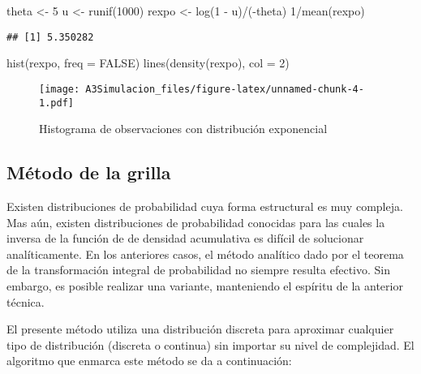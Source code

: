 \documentclass[
  spanish,
]{book}
\newenvironment{Shaded}{\begin{snugshade}}{\end{snugshade}}
\newcommand{\AttributeTok}[1]{\textcolor[rgb]{0.77,0.63,0.00}{#1}}
\newcommand{\ConstantTok}[1]{\textcolor[rgb]{0.00,0.00,0.00}{#1}}
\newcommand{\DecValTok}[1]{\textcolor[rgb]{0.00,0.00,0.81}{#1}}
\newcommand{\FunctionTok}[1]{\textcolor[rgb]{0.00,0.00,0.00}{#1}}
\newcommand{\NormalTok}[1]{#1}
\newcommand{\OtherTok}[1]{\textcolor[rgb]{0.56,0.35,0.01}{#1}}
\newcommand{\SpecialCharTok}[1]{\textcolor[rgb]{0.00,0.00,0.00}{#1}}
\theoremstyle{definition}
\theoremstyle{definition}
\theoremstyle{definition}
\theoremstyle{definition}
\theoremstyle{remark}
\begin{document}
\begin{Shaded}
\begin{Highlighting}[]
\NormalTok{theta }\OtherTok{\textless{}{-}} \DecValTok{5}
\NormalTok{u }\OtherTok{\textless{}{-}} \FunctionTok{runif}\NormalTok{(}\DecValTok{1000}\NormalTok{)}
\NormalTok{rexpo }\OtherTok{\textless{}{-}} \FunctionTok{log}\NormalTok{(}\DecValTok{1} \SpecialCharTok{{-}}\NormalTok{ u)}\SpecialCharTok{/}\NormalTok{(}\SpecialCharTok{{-}}\NormalTok{theta)}
\DecValTok{1}\SpecialCharTok{/}\FunctionTok{mean}\NormalTok{(rexpo)}
\end{Highlighting}
\end{Shaded}

\begin{verbatim}
## [1] 5.350282
\end{verbatim}

\begin{Shaded}
\begin{Highlighting}[]
\FunctionTok{hist}\NormalTok{(rexpo, }\AttributeTok{freq =} \ConstantTok{FALSE}\NormalTok{)}
\FunctionTok{lines}\NormalTok{(}\FunctionTok{density}\NormalTok{(rexpo), }\AttributeTok{col =} \DecValTok{2}\NormalTok{)}
\end{Highlighting}
\end{Shaded}

\begin{figure}
\centering
\texttt{[image: A3Simulacion\_files/figure-latex/unnamed-chunk-4-1.pdf]}
\caption{\label{fig:unnamed-chunk-4}Histograma de observaciones con distribución exponencial}
\end{figure}

\hypertarget{muxe9todo-de-la-grilla}{%
\subsection{Método de la grilla}\label{muxe9todo-de-la-grilla}}

Existen distribuciones de probabilidad cuya forma estructural es muy compleja. Mas aún, existen distribuciones de probabilidad conocidas para las cuales la inversa de la función de de densidad acumulativa es difícil de solucionar analíticamente. En los anteriores casos, el método analítico dado por el teorema de la transformación integral de probabilidad no siempre resulta efectivo. Sin embargo, es posible realizar una variante, manteniendo el espíritu de la anterior técnica.

El presente método utiliza una distribución discreta para aproximar cualquier tipo de distribución (discreta o continua) sin importar su nivel de complejidad. El algoritmo que enmarca este método se da a continuación:
\end{document}
